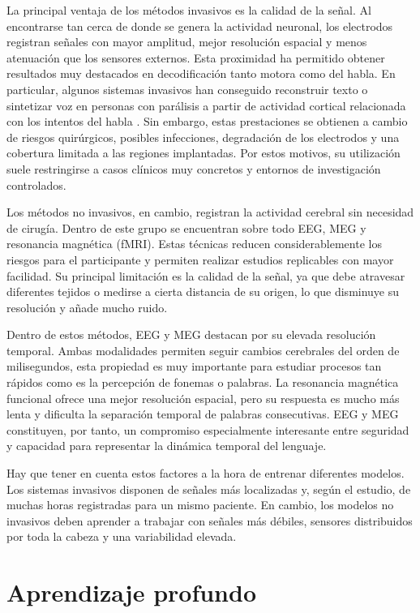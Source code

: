 La principal ventaja de los métodos invasivos es la calidad de la señal. Al encontrarse tan cerca de donde se genera la actividad neuronal, los electrodos registran señales con mayor amplitud, mejor resolución espacial y menos atenuación que los sensores externos. Esta proximidad ha permitido obtener resultados muy destacados en decodificación tanto motora como del habla. En particular, algunos sistemas invasivos han conseguido reconstruir texto o sintetizar voz en personas con parálisis a partir de actividad cortical relacionada con los intentos del habla \cite{jayalath2025unlocking}. Sin embargo, estas prestaciones se obtienen a cambio de riesgos quirúrgicos, posibles infecciones, degradación de los electrodos y una cobertura limitada a las regiones implantadas. Por estos motivos, su utilización suele restringirse a casos clínicos muy concretos y entornos de investigación controlados.

Los métodos no invasivos, en cambio, registran la actividad cerebral sin necesidad de cirugía. Dentro de este grupo se encuentran sobre todo EEG, MEG y resonancia magnética (fMRI). Estas técnicas reducen considerablemente los riesgos para el participante y permiten realizar estudios replicables con mayor facilidad. Su principal limitación es la calidad de la señal, ya que debe atravesar diferentes tejidos o medirse a cierta distancia de su origen, lo que disminuye su resolución y añade mucho ruido.

Dentro de estos métodos, EEG y MEG destacan por su elevada resolución temporal. Ambas modalidades permiten seguir cambios cerebrales del orden de milisegundos, esta propiedad es muy importante para estudiar procesos tan rápidos como es la percepción de fonemas o palabras. La resonancia magnética funcional ofrece una mejor resolución espacial, pero su respuesta es mucho más lenta y dificulta la separación temporal de palabras consecutivas. EEG y MEG constituyen, por tanto, un compromiso especialmente interesante entre seguridad y capacidad para representar la dinámica temporal del lenguaje.

Hay que tener en cuenta estos factores a la hora de entrenar diferentes modelos. Los sistemas invasivos disponen de señales más localizadas y, según el estudio, de muchas horas registradas para un mismo paciente. En cambio, los modelos no invasivos deben aprender a trabajar con señales más débiles, sensores distribuidos por toda la cabeza y una variabilidad elevada.

\section{Aprendizaje profundo}

